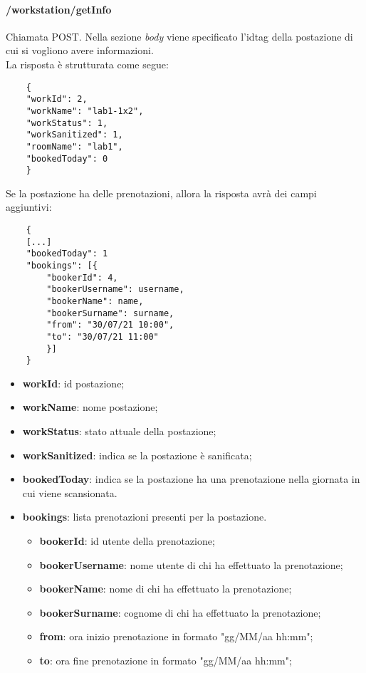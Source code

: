 \paragraph{/workstation/getInfo}
Chiamata POST. Nella sezione \textit{body} viene specificato l'idtag della postazione di cui si vogliono avere informazioni.\\
La risposta è strutturata come segue:
\begin{center}
	\begin{lstlisting}
	{
	"workId": 2,
	"workName": "lab1-1x2", 
	"workStatus": 1, 
	"workSanitized": 1, 
	"roomName": "lab1", 
	"bookedToday": 0
	}
	\end{lstlisting}
\end{center}
Se la postazione ha delle prenotazioni, allora la risposta avrà dei campi aggiuntivi:
\begin{center}
	\begin{lstlisting}
	{
	[...]
	"bookedToday": 1
	"bookings": [{
		"bookerId": 4,
		"bookerUsername": username,
		"bookerName": name,
		"bookerSurname": surname,
		"from": "30/07/21 10:00",
		"to": "30/07/21 11:00"
		}]
	}
	\end{lstlisting}
\end{center}
\begin{itemize}
	\item \textbf{workId}: id postazione;
	\item \textbf{workName}: nome postazione;	
	\item \textbf{workStatus}: stato attuale della postazione;	
	\item \textbf{workSanitized}: indica se la postazione è sanificata;
	\item \textbf{bookedToday}: indica se la postazione ha una prenotazione nella giornata in cui viene scansionata.
	\item \textbf{bookings}: lista prenotazioni presenti per la postazione.
	\begin{itemize}		
		\item \textbf{bookerId}: id utente della prenotazione;
		\item \textbf{bookerUsername}: nome utente di chi ha effettuato la prenotazione;
		\item \textbf{bookerName}: nome di chi ha effettuato la prenotazione;
		\item \textbf{bookerSurname}: cognome di chi ha effettuato la prenotazione;
		\item \textbf{from}: ora inizio prenotazione in formato "gg/MM/aa hh:mm";
		\item \textbf{to}: ora fine prenotazione in formato "gg/MM/aa hh:mm";
	\end{itemize}
\end{itemize}
